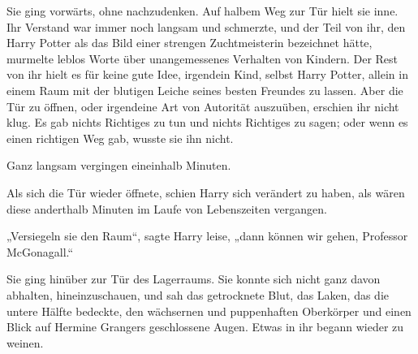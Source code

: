 Sie ging vorwärts, ohne nachzudenken. Auf halbem Weg zur Tür hielt sie inne. Ihr Verstand war immer noch langsam und schmerzte, und der Teil von ihr, den Harry Potter als das Bild einer strengen Zuchtmeisterin bezeichnet hätte, murmelte leblos Worte über unangemessenes Verhalten von Kindern. Der Rest von ihr hielt es für keine gute Idee, irgendein Kind, selbst Harry Potter, allein in einem Raum mit der blutigen Leiche seines besten Freundes zu lassen. Aber die Tür zu öffnen, oder irgendeine Art von Autorität auszuüben, erschien ihr nicht klug. Es gab nichts Richtiges zu tun und nichts Richtiges zu sagen; oder wenn es einen richtigen Weg gab, wusste sie ihn nicht.

Ganz langsam vergingen eineinhalb Minuten.

\later

Als sich die Tür wieder öffnete, schien Harry sich verändert zu haben, als wären diese anderthalb Minuten im Laufe von Lebenszeiten vergangen.

„Versiegeln sie den Raum“, sagte Harry leise, „dann können wir gehen, Professor McGonagall.“

Sie ging hinüber zur Tür des Lagerraums. Sie konnte sich nicht ganz davon abhalten, hineinzuschauen, und sah das getrocknete Blut, das Laken, das die untere Hälfte bedeckte, den wächsernen und puppenhaften Oberkörper und einen Blick auf Hermine Grangers geschlossene Augen. Etwas in ihr begann wieder zu weinen.

